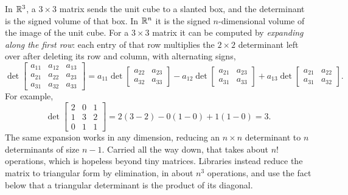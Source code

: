 In $\mathbb{R}^3$, a $3 \times 3$ matrix sends the unit cube to a slanted box,
and the determinant is the signed volume of that box. In $\mathbb{R}^n$ it is the
signed $n$-dimensional volume of the image of the unit cube. For a
$3 \times 3$ matrix it can be computed by \emph{expanding along the first
row}: each entry of that row multiplies the $2 \times 2$ determinant left
over after deleting its row and column, with alternating signs,
\[
  \det \begin{bmatrix}
    a_{11} & a_{12} & a_{13} \\
    a_{21} & a_{22} & a_{23} \\
    a_{31} & a_{32} & a_{33}
  \end{bmatrix}
  = a_{11} \det \begin{bmatrix} a_{22} & a_{23} \\ a_{32} & a_{33}
    \end{bmatrix}
  - a_{12} \det \begin{bmatrix} a_{21} & a_{23} \\ a_{31} & a_{33}
    \end{bmatrix}
  + a_{13} \det \begin{bmatrix} a_{21} & a_{22} \\ a_{31} & a_{32}
    \end{bmatrix}.
\]
For example,
\[
  \det \begin{bmatrix} 2 & 0 & 1 \\ 1 & 3 & 2 \\ 0 & 1 & 1 \end{bmatrix}
  = 2(3 - 2) - 0(1 - 0) + 1(1 - 0) = 3 .
\]
The same expansion works in any dimension, reducing an $n \times n$
determinant to $n$ determinants of size $n - 1$. Carried all the way
down, that takes about $n!$ operations, which is hopeless beyond tiny
matrices. Libraries instead reduce the matrix to triangular form by
elimination, in about $n^3$ operations, and use the fact below that a
triangular determinant is the product of its diagonal.

